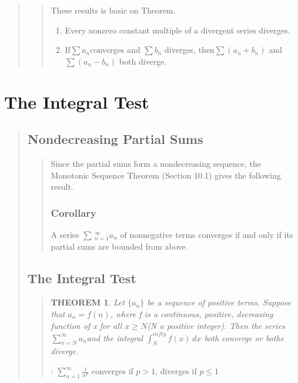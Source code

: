 \documentclass{report}
\newtheorem{theorem}{THEOREM}
\begin{document}
\begin{quote}
\begin{quote}
		These results is basic on Theorem.

		\begin{enumerate}
			\item Every nonzero constant multiple of a divergent series diverges.
			\item If$\sum a_n$converges and $\sum b_n$ diverges, then$\sum (a_n + b_n)$ and $\sum (a_n - b_n)$ both diverge.
		\end{enumerate}

	\end{quote}


\end{quote}


\section{The Integral Test }
\begin{quote}

	\subsection{Nondecreasing Partial Sums}
	\begin{quote}
		Since the partial sums form a nondecreasing sequence, the Monotonic Sequence Theorem (Section 10.1) gives the following result.
		\subsubsection{Corollary}
		A series $\sum \,_{n=1}^{\infty} a_n$ of nonnegative terms converges if and only if its partial sums are bounded from above.
	\end{quote}
	
	\subsection{The Integral Test}
	\begin{quote}
		\begin{theorem}
			Let $\{a_n\}$ be a sequence of positive terms. Suppose that $a_n = f(n)$, where f is a continuous, positive, decreasing function of x for all $x\geq N$(N a positive integer). Then the series $\sum_{n=N}^{\infty}a_n$and the integral $\int_{N}^{infty}f(x)\,dx$ both converge or bothe diverge.
		\end{theorem}

		\begin{info}[p-series]
			: $\sum_{n=1}^{\infty}\frac{1}{n^p}$ converges if $p>1$, diverges if $p\leq 1$
		\end{info}

	\end{quote}

\end{quote}
\end{document}
